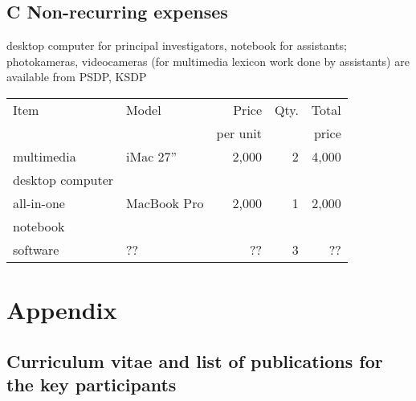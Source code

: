 \documentclass[a4paper,12pt]{article}
\begin{document}


\subsection*{C Non-recurring expenses}
\noindent desktop computer for principal investigators, notebook for assistants; photokameras, videocameras (for multimedia lexicon work done by assistants) are available from PSDP, KSDP %
\begin{longtable}{| l | l | r | r | r |}
\hline
Item&Model&Price&Qty.&Total\\
	&&per unit&&price\\
\hline
multimedia&iMac 27”&2,000&2&4,000\\
desktop computer&&&&\\
\hline
all-in-one&MacBook Pro&2,000&1&2,000\\
notebook&&&&\\
\hline
software&??&??&3&??\\
\hline
\end{longtable}

\newpage
\section*{Appendix}
\subsection*{Curriculum vitae and list of publications for the key participants}
\end{document}
